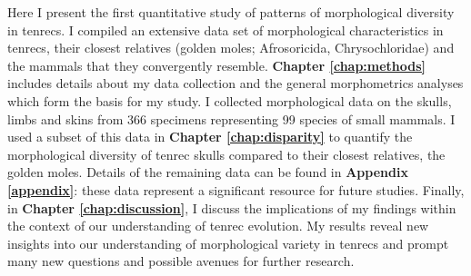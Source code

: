 
	Here I present the first quantitative study of patterns of morphological diversity in tenrecs. I compiled an extensive data set of morphological characteristics in tenrecs, their closest relatives (golden moles; Afrosoricida, Chrysochloridae) and the mammals that they convergently resemble. \textbf{Chapter \ref{chap:methods}} includes details about my data collection and the general morphometrics analyses which form the basis for my study. I collected morphological data on the skulls, limbs and skins from 366 specimens representing 99 species of small mammals. I used a subset of this data in \textbf{Chapter \ref{chap:disparity}} to quantify the morphological diversity of tenrec skulls compared to their closest relatives, the golden moles. Details of the remaining data can be found in \textbf{Appendix \ref{appendix}}: these data represent a significant resource for future studies. Finally, in \textbf{Chapter \ref{chap:discussion}}, I discuss the implications of my findings within the context of our understanding of tenrec evolution. My results reveal new insights into our understanding of morphological variety in tenrecs and prompt many new questions and possible avenues for further research.


